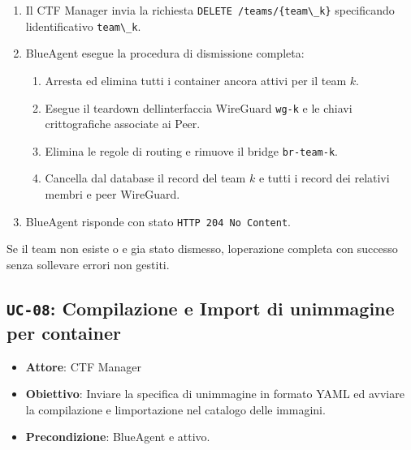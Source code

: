 \begin{enumerate}
\def\labelenumi{\arabic{enumi}.}
\tightlist
\item
  Il CTF Manager invia la richiesta
  \passthrough{\lstinline!DELETE /teams/\{team\_k\}!} specificando
  l\textquotesingle identificativo \passthrough{\lstinline!team\_k!}.
\item
  BlueAgent esegue la procedura di dismissione completa:

  \begin{enumerate}
  \def\labelenumii{\arabic{enumii}.}
  \tightlist
  \item
    Arresta ed elimina tutti i container ancora attivi per il team
    \(k\).
  \item
    Esegue il teardown dell\textquotesingle interfaccia WireGuard
    \passthrough{\lstinline!wg-k!} e le chiavi crittografiche associate
    ai Peer.
  \item
    Elimina le regole di routing e rimuove il bridge
    \passthrough{\lstinline!br-team-k!}.
  \item
    Cancella dal database il record del team \(k\) e tutti i record dei
    relativi membri e peer WireGuard.
  \end{enumerate}
\item
  BlueAgent risponde con stato
  \passthrough{\lstinline!HTTP 204 No Content!}.
\end{enumerate}

Se il team non esiste o e\textquotesingle{} gia stato dismesso,
l\textquotesingle operazione completa con successo senza sollevare
errori non gestiti.

\subsection{\texorpdfstring{\texttt{UC-08}: Compilazione e Import di
un\textquotesingle immagine per
container}{UC-08: Compilazione e Import di un\textquotesingle immagine per container}}\label{uc-08-compilazione-e-import-di-unimmagine-per-container}

\begin{itemize}
\tightlist
\item
  \textbf{Attore}: CTF Manager
\item
  \textbf{Obiettivo}: Inviare la specifica di
  un\textquotesingle immagine in formato YAML ed avviare la compilazione
  e l\textquotesingle importazione nel catalogo delle immagini.
\item
  \textbf{Precondizione}: BlueAgent e\textquotesingle{} attivo.
\end{itemize}


